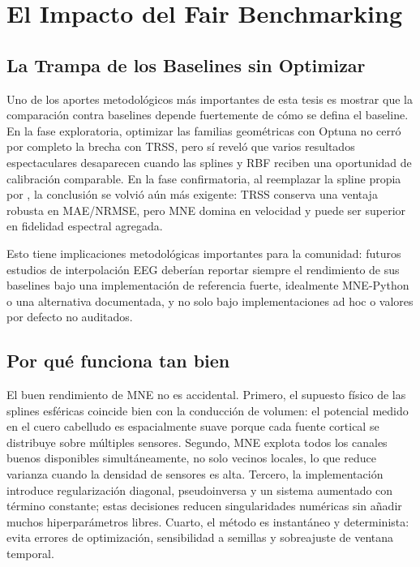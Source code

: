 \section{El Impacto del Fair Benchmarking}

\subsection{La Trampa de los Baselines sin Optimizar}

Uno de los aportes metodológicos más importantes de esta tesis es mostrar que la comparación contra baselines depende fuertemente de cómo se defina el baseline. En la fase exploratoria, optimizar las familias geométricas con Optuna no cerró por completo la brecha con TRSS, pero sí reveló que varios resultados espectaculares desaparecen cuando las splines y RBF reciben una oportunidad de calibración comparable. En la fase confirmatoria, al reemplazar la spline propia por , la conclusión se volvió aún más exigente: TRSS conserva una ventaja robusta en MAE/NRMSE, pero MNE domina en velocidad y puede ser superior en fidelidad espectral agregada.

Esto tiene implicaciones metodológicas importantes para la comunidad: futuros estudios de interpolación EEG deberían reportar siempre el rendimiento de sus baselines bajo una implementación de referencia fuerte, idealmente MNE-Python o una alternativa documentada, y no solo bajo implementaciones ad hoc o valores por defecto no auditados.

\subsection{Por qué  funciona tan bien}

El buen rendimiento de MNE no es accidental. Primero, el supuesto físico de las splines esféricas coincide bien con la conducción de volumen: el potencial medido en el cuero cabelludo es espacialmente suave porque cada fuente cortical se distribuye sobre múltiples sensores. Segundo, MNE explota todos los canales buenos disponibles simultáneamente, no solo vecinos locales, lo que reduce varianza cuando la densidad de sensores es alta. Tercero, la implementación introduce regularización diagonal, pseudoinversa y un sistema aumentado con término constante; estas decisiones reducen singularidades numéricas sin añadir muchos hiperparámetros libres. Cuarto, el método es instantáneo y determinista: evita errores de optimización, sensibilidad a semillas y sobreajuste de ventana temporal.

